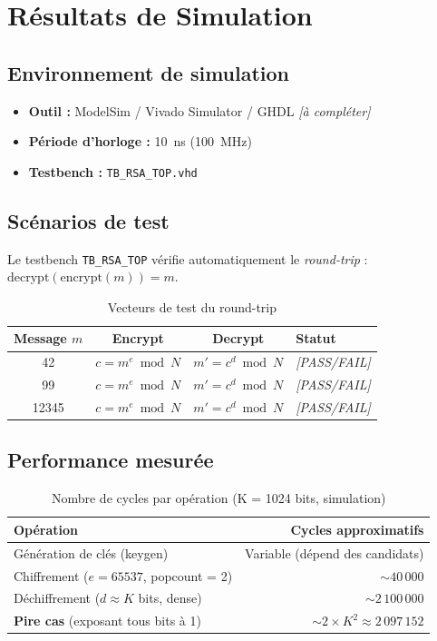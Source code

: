 \documentclass[12pt,a4paper]{report}
\begin{document}
\section{Résultats de Simulation}
\label{ch:sim}

\subsection{Environnement de simulation}
\begin{itemize}
  \item \textbf{Outil :} ModelSim / Vivado Simulator / GHDL
        \textit{[à compléter]}
  \item \textbf{Période d'horloge :} 10~ns (100~MHz)
  \item \textbf{Testbench :} \texttt{TB\_RSA\_TOP.vhd}
\end{itemize}

\subsection{Scénarios de test}

Le testbench \texttt{TB\_RSA\_TOP} vérifie automatiquement le
\textit{round-trip} : $\text{decrypt}(\text{encrypt}(m)) = m$.

\begin{table}[H]
\centering
\caption{Vecteurs de test du round-trip}
\begin{tabular}{cccl}
\toprule
\textbf{Message $m$} & \textbf{Encrypt} & \textbf{Decrypt} & \textbf{Statut} \\
\midrule
42    & $c = m^e \bmod N$ & $m' = c^d \bmod N$ & \textit{[PASS/FAIL]} \\
99    & $c = m^e \bmod N$ & $m' = c^d \bmod N$ & \textit{[PASS/FAIL]} \\
12345 & $c = m^e \bmod N$ & $m' = c^d \bmod N$ & \textit{[PASS/FAIL]} \\
\bottomrule
\end{tabular}
\end{table}

\subsection{Performance mesurée}

\begin{table}[H]
\centering
\caption{Nombre de cycles par opération (K = 1024 bits, simulation)}
\begin{tabular}{lr}
\toprule
\textbf{Opération} & \textbf{Cycles approximatifs} \\
\midrule
Génération de clés (keygen)                     & Variable (dépend des candidats) \\
Chiffrement ($e = 65537$, popcount = 2)         & $\sim 40\,000$ \\
Déchiffrement ($d \approx K$ bits, dense)       & $\sim 2\,100\,000$ \\
\textbf{Pire cas} (exposant tous bits à 1)      & $\sim 2 \times K^2 \approx 2\,097\,152$ \\
\bottomrule
\end{tabular}
\end{table}
\end{document}
